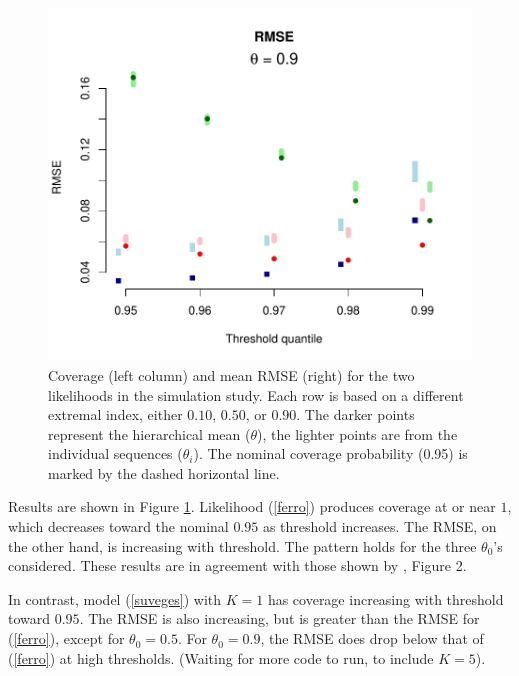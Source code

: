 \begin{figure}[th!]
\begin{center}
\includegraphics[scale=0.48]{../extremal_comparison/figs/sim_rmse_90.pdf}
\end{center}
\caption{Coverage (left column) and mean RMSE (right) for the two likelihoods in the simulation study. Each row is based on a different extremal index, either $0.10$, $0.50$, or $0.90$. The darker points represent the hierarchical mean ($\theta$), the lighter points are from the individual sequences ($\theta_i$). The nominal coverage probability (0.95) is marked by the dashed horizontal line.}
\label{figsim}
\end{figure}

Results are shown in Figure \ref{figsim}. Likelihood (\ref{ferro}) produces coverage at or near $1$, which decreases toward the nominal $0.95$ as threshold increases. The RMSE, on the other hand, is increasing with threshold. The pattern holds for the three $\theta_0$'s considered. These results are in agreement with those shown by \cite{ferro2003inference}, Figure 2.

In contrast, model (\ref{suveges}) with $K=1$ has coverage increasing with threshold toward $0.95$. The RMSE is also increasing, but is greater than the RMSE for (\ref{ferro}), except for $\theta_0=0.5$. For $\theta_0=0.9$, the RMSE does drop below that of (\ref{ferro}) at high thresholds. (Waiting for more code to run, to include $K=5$).
